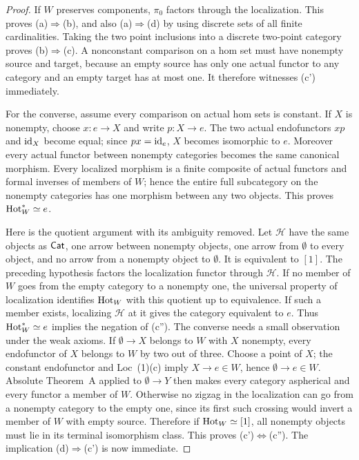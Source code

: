 \begin{proof}
If $W$ preserves components, $\pi_0$ factors through the localization.
This proves (a)$\Rightarrow$(b), and also (a)$\Rightarrow$(d) by
using discrete sets of all finite cardinalities.  Taking the two
point inclusions into a discrete two-point category proves
(b)$\Rightarrow$(c).  A nonconstant comparison on a hom set must have
nonempty source and target, because an empty source has only one
actual functor to any category and an empty target has at most one.
It therefore witnesses (c') immediately.

For the converse, assume every comparison on actual hom sets is
constant.  If $X$ is nonempty, choose $x:e\to X$ and write $p:X\to e$.
The two actual endofunctors $xp$ and $\mathrm{id}_X$ become equal; since
$px=\mathrm{id}_e$, $X$ becomes isomorphic to $e$.  Moreover every actual
functor between nonempty categories becomes the same canonical
morphism.  Every localized morphism is a finite composite of actual
functors and formal inverses of members of $W$; hence the entire full
subcategory on the nonempty categories has one morphism between
any two objects.  This proves $\operatorname{Hot}_W^*\simeq e$.

Here is the quotient argument with its ambiguity removed.  Let
$\mathcal H$ have the same objects as $\mathsf{Cat}$, one arrow between
nonempty objects, one arrow from $\emptyset$ to every object, and no
arrow from a nonempty object to $\emptyset$.  It is equivalent to
$[1]$.  The preceding hypothesis factors the localization functor
through $\mathcal H$.  If no member of $W$ goes from the empty category
to a nonempty one, the universal property of localization identifies
$\operatorname{Hot}_W$ with this quotient up to equivalence.  If such a member
exists, localizing $\mathcal H$ at it gives the category equivalent
to $e$.  Thus $\operatorname{Hot}_W^*\simeq e$ implies the negation of (c'').
The converse needs a small observation under the weak axioms.  If
$\emptyset\to X$ belongs to $W$ with $X$ nonempty, every endofunctor
of $X$ belongs to $W$ by two out of three.  Choose a point of $X$;
the constant endofunctor and Loc~(1)(c) imply $X\to e\in W$, hence
$\emptyset\to e\in W$.  Absolute Theorem~A applied to
$\emptyset\to Y$ then makes every category aspherical and every
functor a member of $W$.  Otherwise no zigzag in the localization can
go from a nonempty category to the empty one, since its first such
crossing would invert a member of $W$ with empty source.  Therefore
if $\operatorname{Hot}_W\simeq[1]$, all nonempty objects must lie in its terminal
isomorphism class.  This proves (c')$\Longleftrightarrow$(c'').
The implication (d)$\Rightarrow$(c') is now immediate.


\end{proof}
